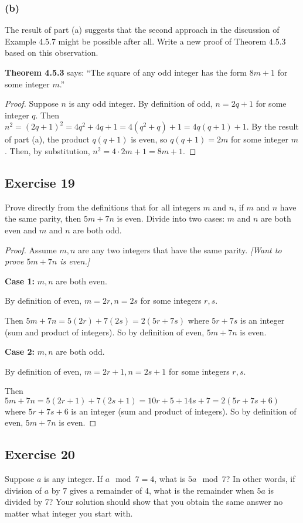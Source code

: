 \documentclass[14pt]{extarticle}
\begin{document}
\subsubsection{(b)}
The result of part (a) suggests that the second approach in the discussion of Example 4.5.7 might be possible after all. Write a new proof of Theorem 4.5.3 based on this observation.

    {\bf Theorem 4.5.3} says: ``The square of any odd integer has the form $8m + 1$ for some integer $m$.''

\begin{proof}
    Suppose $n$ is any odd integer. By definition of odd, $n = 2q + 1$ for some integer $q$. Then $n^2 = (2q + 1)^2 = 4q^2 + 4q + 1 = 4(q^2 + q) + 1 = 4q(q + 1) + 1$. By the result of part (a), the product $q(q + 1)$ is even, so $q(q + 1) = 2m$ for some integer $m$. Then, by substitution, $n^2 = 4\cdot2m + 1 = 8m + 1$.
\end{proof}

\subsection{Exercise 19}
Prove directly from the definitions that for all integers $m$ and $n$, if $m$ and $n$ have the same parity, then $5m + 7n$ is even. Divide into two cases: $m$ and $n$ are both even and $m$ and $n$ are both odd.

\begin{proof}
    Assume $m, n$ are any two integers that have the same parity. {\it [Want to prove $5m+7n$ is even.]}

        {\bf Case 1:} $m,n$ are both even.

    By definition of even, $m = 2r, n = 2s$ for some integers $r, s$.

    Then $5m+7n = 5(2r) + 7(2s) = 2(5r + 7s)$ where $5r + 7s$ is an integer (sum and product of integers). So by definition of even, $5m+7n$ is even.

        {\bf Case 2:} $m,n$ are both odd.

    By definition of even, $m = 2r+1, n = 2s+1$ for some integers $r, s$.

    Then $5m+7n = 5(2r+1) + 7(2s+1) = 10r+5+14s+7 = 2(5r+7s+6)$ where $5r+7s+6$ is an integer (sum and product of integers). So by definition of even, $5m+7n$ is even.
\end{proof}

\subsection{Exercise 20}
Suppose $a$ is any integer. If $a \mod 7 = 4$, what is $5a \mod 7$? In other words, if division of $a$ by $7$ gives a remainder of 4, what is the remainder when $5a$ is divided by 7? Your solution should show that you obtain the same answer no matter what integer you start with.
\end{document}
